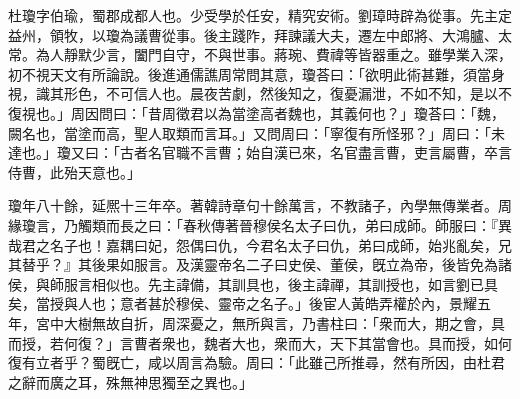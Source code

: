 
\begin{pinyinscope}
杜瓊字伯瑜，蜀郡成都人也。少受學於任安，精究安術。劉璋時辟為從事。先主定益州，領牧，以瓊為議曹從事。後主踐阼，拜諫議大夫，遷左中郎將、大鴻臚、太常。為人靜默少言，闔門自守，不與世事。蔣琬、費禕等皆器重之。雖學業入深，初不視天文有所論說。後進通儒譙周常問其意，瓊荅曰：「欲明此術甚難，須當身視，識其形色，不可信人也。晨夜苦劇，然後知之，復憂漏泄，不如不知，是以不復視也。」周因問曰：「昔周徵君以為當塗高者魏也，其義何也？」瓊荅曰：「魏，闕名也，當塗而高，聖人取類而言耳。」又問周曰：「寧復有所怪邪？」周曰：「未達也。」瓊又曰：「古者名官職不言曹；始自漢已來，名官盡言曹，吏言屬曹，卒言侍曹，此殆天意也。」

瓊年八十餘，延熈十三年卒。著韓詩章句十餘萬言，不教諸子，內學無傳業者。周緣瓊言，乃觸類而長之曰：「春秋傳著晉穆侯名太子曰仇，弟曰成師。師服曰：『異哉君之名子也！嘉耦曰妃，怨偶曰仇，今君名太子曰仇，弟曰成師，始兆亂矣，兄其替乎？』其後果如服言。及漢靈帝名二子曰史侯、董侯，旣立為帝，後皆免為諸侯，與師服言相似也。先主諱備，其訓具也，後主諱禪，其訓授也，如言劉已具矣，當授與人也；意者甚於穆侯、靈帝之名子。」後宦人黃皓弄權於內，景耀五年，宮中大樹無故自折，周深憂之，無所與言，乃書柱曰：「衆而大，期之會，具而授，若何復？」言曹者衆也，魏者大也，衆而大，天下其當會也。具而授，如何復有立者乎？蜀旣亡，咸以周言為驗。周曰：「此雖己所推尋，然有所因，由杜君之辭而廣之耳，殊無神思獨至之異也。」


\end{pinyinscope}